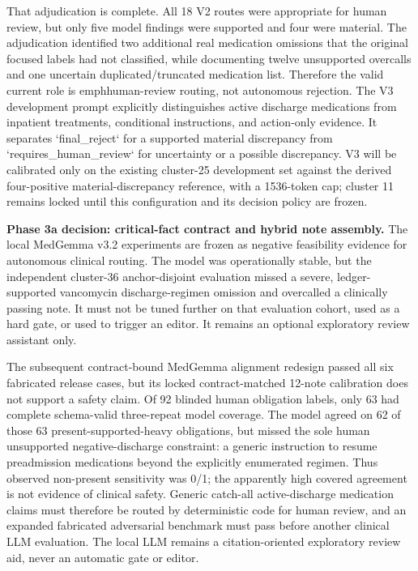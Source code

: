 \documentclass[11pt]{article}
\begin{document}
That adjudication is complete. All 18 V2 routes were appropriate for human review, but only five model findings were supported and four were material. The adjudication identified two additional real medication omissions that the original focused labels had not classified, while documenting twelve unsupported overcalls and one uncertain duplicated/truncated medication list. Therefore the valid current role is emph{human-review routing}, not autonomous rejection. The V3 development prompt explicitly distinguishes active discharge medications from inpatient treatments, conditional instructions, and action-only evidence. It separates `final_reject` for a supported material discrepancy from `requires_human_review` for uncertainty or a possible discrepancy. V3 will be calibrated only on the existing cluster-25 development set against the derived four-positive material-discrepancy reference, with a 1536-token cap; cluster 11 remains locked until this configuration and its decision policy are frozen.

\noindent\textbf{Phase 3a decision: critical-fact contract and hybrid note assembly.}
The local MedGemma v3.2 experiments are frozen as negative feasibility evidence for autonomous clinical routing. The model was operationally stable, but the independent cluster-36 anchor-disjoint evaluation missed a severe, ledger-supported vancomycin discharge-regimen omission and overcalled a clinically passing note. It must not be tuned further on that evaluation cohort, used as a hard gate, or used to trigger an editor. It remains an optional exploratory review assistant only.

The subsequent contract-bound MedGemma alignment redesign passed all six fabricated release cases, but its locked contract-matched 12-note calibration does not support a safety claim. Of 92 blinded human obligation labels, only 63 had complete schema-valid three-repeat model coverage. The model agreed on 62 of those 63 present-supported-heavy obligations, but missed the sole human unsupported negative-discharge constraint: a generic instruction to resume preadmission medications beyond the explicitly enumerated regimen. Thus observed non-present sensitivity was 0/1; the apparently high covered agreement is not evidence of clinical safety. Generic catch-all active-discharge medication claims must therefore be routed by deterministic code for human review, and an expanded fabricated adversarial benchmark must pass before another clinical LLM evaluation. The local LLM remains a citation-oriented exploratory review aid, never an automatic gate or editor.
\end{document}
